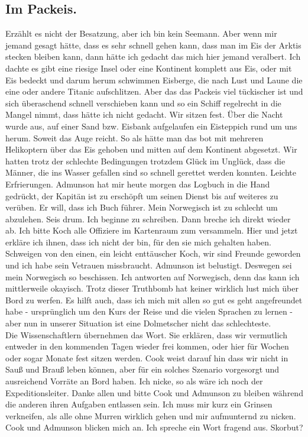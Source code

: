 \documentclass{article}
\begin{document}
\subsection{
  Im Packeis.
}
\noindent Erzählt es nicht der Besatzung, aber ich bin kein Seemann. Aber wenn mir jemand gesagt hätte, dass es sehr
schnell gehen kann, dass man im Eis der Arktis stecken bleiben kann, dann hätte ich gedacht das mich hier jemand
veralbert. Ich dachte es gibt eine riesige Insel oder eine Kontinent komplett aus Eis, oder mit Eis bedeckt und
darum herum schwimmen Eisberge, die nach Lust und Laune die eine oder andere Titanic aufschlitzen. Aber das das
Packeis viel tückischer ist und sich überaschend schnell verschieben kann und so ein Schiff regelrecht in die
Mangel nimmt, dass hätte ich nicht gedacht. Wir sitzen fest. Über die Nacht wurde aus, auf einer Sand bzw.
Eisbank aufgelaufen ein Eisteppich rund um uns herum. Soweit das Auge reicht. So als hätte man das bot mit
mehreren Helikoptern über das Eis gehoben und mitten auf dem Kontinent abgesetzt. Wir hatten trotz der schlechte
Bedingungen trotzdem Glück im Unglück, dass die Männer, die ins Wasser gefallen sind so schnell gerettet werden
konnten. Leichte Erfrierungen. Admunson hat mir heute morgen das Logbuch in die Hand gedrückt, der Kapitän ist
zu erschöpft um seinen Dienst bis auf weiteres zu verüben. Er will, dass ich
Buch führer. Mein Norwegisch ist zu schlecht um abzulehen. Seis drum. Ich beginne zu schreiben. Dann breche ich
direkt wieder ab.
Ich bitte Koch alle Offiziere im Kartenraum zum versammeln. Hier und jetzt erkläre ich ihnen, dass ich nicht der
bin, für den sie mich gehalten haben. Schweigen von den einen, ein leicht enttäuscher Koch, wir sind Freunde
geworden und ich habe sein Vetrauen missbraucht. Admunson ist belustigt. Deswegen sei mein Norwegisch so
beschissen. Ich antworten auf Norwegisch, denn das kann ich mittlerweile okayisch.
Trotz dieser Truthbomb hat keiner wirklich lust mich über Bord zu werfen. Es hilft auch, dass ich mich mit allen
so gut es geht angefreundet habe - ursprünglich um den Kurs der Reise und die vielen Sprachen zu lernen - aber
nun in unserer Situation ist eine Dolmetscher nicht das schlechteste.
\\
\noindent Die Wissenschaftlern übernehmen das Wort. Sie erklären, dass wir vermutlich entweder in den kommenden Tagen
wieder frei kommen, oder hier für Wochen oder sogar Monate fest sitzen werden. Cook weist darauf hin dass wir
nicht in Sauß und Brauß leben können, aber für ein solches Szenario vorgesorgt und ausreichend Vorräte an Bord
haben. Ich nicke, so als wäre ich noch der Expeditionsleiter. Danke allen und bitte Cook und Admunson zu bleiben
während die anderen ihren Aufgaben entlassen sein. Ich muss mir kurz ein Grinsen verkneifen, als alle ohne
Murren wirklich gehen und mir aufmunternd zu nicken. Cook und Admunson blicken mich an. Ich spreche ein Wort
fragend aus. Skorbut?\\
\end{document}

